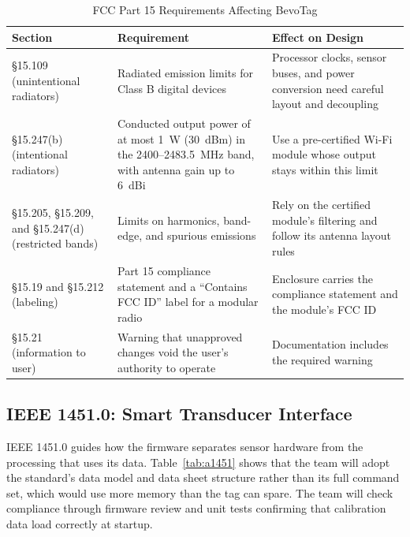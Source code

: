 \documentclass[12pt,letterpaper]{article}
\newenvironment{spectable}{\setstretch{1.0}\renewcommand{\arraystretch}{1.1}}{}
\begin{document}
\begin{table}[H]
\caption{FCC Part 15 Requirements Affecting BevoTag}
\label{tab:afcc}
\centering
\begin{spectable}
\begin{tabularx}{\linewidth}{@{}L{1.7in} Y Y@{}}
\toprule
\textbf{Section} & \textbf{Requirement} & \textbf{Effect on Design} \\
\midrule
\S15.109 (unintentional radiators) & Radiated emission limits for Class B digital devices \cite{fcc15} & Processor clocks, sensor buses, and power conversion need careful layout and decoupling \\
\S15.247(b) (intentional radiators) & Conducted output power of at most 1~W (30~dBm) in the 2400--2483.5~MHz band, with antenna gain up to 6~dBi \cite{fcc15} & Use a pre-certified Wi-Fi module whose output stays within this limit \\
\S15.205, \S15.209, and \S15.247(d) (restricted bands) & Limits on harmonics, band-edge, and spurious emissions \cite{fcc15} & Rely on the certified module's filtering and follow its antenna layout rules \\
\S15.19 and \S15.212 (labeling) & Part 15 compliance statement and a ``Contains FCC ID'' label for a modular radio \cite{fcc15} & Enclosure carries the compliance statement and the module's FCC ID \\
\S15.21 (information to user) & Warning that unapproved changes void the user's authority to operate \cite{fcc15} & Documentation includes the required warning \\
\bottomrule
\end{tabularx}
\end{spectable}
\end{table}

\subsection{IEEE 1451.0: Smart Transducer Interface}
IEEE 1451.0 \cite{std1451} guides how the firmware separates sensor hardware from the processing
that uses its data. Table~\ref{tab:a1451} shows that the team will adopt the
standard's data model and data sheet structure rather than its full command set, which would use
more memory than the tag can spare. The team will check compliance through firmware review and unit
tests confirming that calibration data load correctly at startup.
\end{document}
